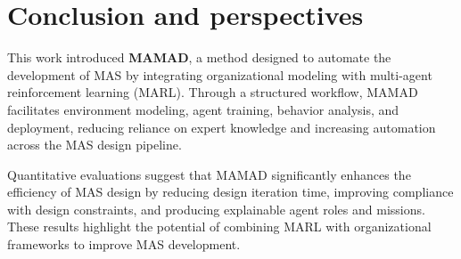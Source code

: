 \documentclass[pdflatex,sn-mathphys-num]{sn-jnl}%
\theoremstyle{thmstyleone}%
\theoremstyle{thmstyletwo}%
\theoremstyle{thmstylethree}%
\begin{document}
\clearpage

\section{Conclusion and perspectives}\label{sec:conclusion}

This work introduced \textbf{MAMAD}, a method designed to automate the development of MAS by integrating organizational modeling with multi-agent reinforcement learning (MARL). Through a structured workflow, MAMAD facilitates environment modeling, agent training, behavior analysis, and deployment, reducing reliance on expert knowledge and increasing automation across the MAS design pipeline. 

Quantitative evaluations suggest that MAMAD significantly enhances the efficiency of MAS design by reducing design iteration time, improving compliance with design constraints, and producing explainable agent roles and missions. These results highlight the potential of combining MARL with organizational frameworks to improve MAS development.
\end{document}
